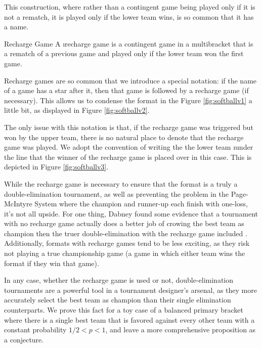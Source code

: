 {    This construction, where rather than a contingent game being played only if it is not a rematch, it is played only if the lower team wins, is so common that it has a name.

    \begin{definition}{Recharge Game}{}
        A \i{recharge game} is a contingent game in a multibracket that is a rematch of a previous game and played only if the lower team won the first game.
    \end{definition}

    Recharge games are so common that we introduce a special notation: if the name of a game has a star after it, then that game is followed by a recharge game (if necessary). This allows us to condense the format in the Figure \ref{fig:softballv1} a little bit, as displayed in Figure \ref{fig:softballv2}.


    The only issue with this notation is that, if the recharge game was triggered but won by the upper team, there is no natural place to denote that the recharge game was played. We adopt the convention of writing the the lower team \i{under} the line that the winner of the recharge game is placed over in this case. This is depicted in Figure \ref{fig:softballv3}.
    

    While the recharge game is necessary to ensure that the format is a truly a double-elimination tournament, as well as preventing the problem in the Page-McIntyre System where the champion and runner-up each finish with one-loss, it's not all upside. For one thing, Dabney found some evidence that a tournament with no recharge game actually does a better job of crowing the best team as champion then the truer double-elimination with the recharge game included \cite{recharge_rounds}. Additionally, formats with recharge games tend to be less exciting, as they risk not playing a true championship game (a game in which either team wins the format if they win that game).

    In any case, whether the recharge game is used or not, double-elimination tournaments are a powerful tool in a tournament designer's arsenal, as they more accurately select the best team as champion than their single elimination counterparts. We prove this fact for a toy case of a balanced primary bracket where there is a single best team that is favored against every other team with a constant probability $1/2 < p < 1$, and leave a more comprehensive proposition as a conjecture.

}
